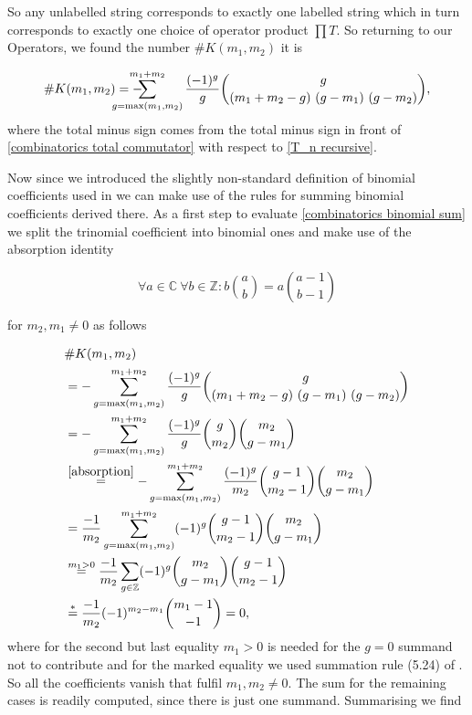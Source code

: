 \documentclass[b5paper,draft,openbib,12pt]{memoir}
\begin{document}
So any unlabelled  string corresponds to exactly one labelled string which in turn corresponds to 
exactly one choice of operator product \(\prod T\). 
So returning to our Operators, we found the number \(\#K(m_1,m_2)\) it is

\begin{equation}\label{combinatorics binomial sum}
\#K(m_1,m_2) =-\hspace{-0.9cm}\sum_{g=\max(m_1,m_2)}^{m_1+m_2} \frac{(-1)^g}{g} \binom{g}{(m_1+m_2-g) \ (g-m_1) \ (g - m_2)},
\end{equation}
where the total minus sign comes from the total minus sign in front of \eqref{combinatorics total commutator}
with respect to \eqref{T_n recursive}. 

Now since we introduced the slightly non-standard definition of binomial coefficients used in \cite{graham1994concrete} we
can make use of the rules for summing binomial coefficients derived there.
As a first step to evaluate \eqref{combinatorics binomial sum} we split the trinomial coefficient into binomial
ones and make use of the absorption identity

\begin{equation}\tag{absorption}\label{absorption}
\forall a \in \mathbb{C}\ \forall b \in \mathbb{Z}: b \binom{a}{b} = a \binom{a-1}{b-1} 
\end{equation}

for \(m_2,m_1\neq 0\) as follows

\begin{align*}
&\#K(m_1,m_2) \\
&=-\sum_{g=\max(m_1,m_2)}^{m_1+m_2} \frac{(-1)^g}{g} \binom{g}{(m_1+m_2-g) \ (g-m_1) \ (g - m_2)}\\
&=-\sum_{g=\max(m_1,m_2)}^{m_1+m_2} \frac{(-1)^g}{g} \binom{g}{m_2}\binom{m_2}{g-m_1}\\
&\stackrel{\eqref{absorption}}{=}-\sum_{g=\max(m_1,m_2)}^{m_1+m_2} \frac{(-1)^g}{m_2} \binom{g-1}{m_2-1}\binom{m_2}{g-m_1}\\
&=\frac{-1}{m_2} \sum_{g=\max(m_1,m_2)}^{m_1+m_2} (-1)^g \binom{g-1}{m_2-1}\binom{m_2}{g-m_1}\\
&\overset{m_1>0}{=}\frac{-1}{m_2} \sum_{g\in\mathbb{Z}} (-1)^g \binom{m_2}{g-m_1}\binom{g-1}{m_2-1}\\
&\stackrel{*}{=} \frac{-1}{m_2} (-1)^{m_2-m_1} \binom{m_1-1}{-1} = 0,
\end{align*}
where for the second but last equality \(m_1>0\) is needed for the \(g=0\) summand not to contribute and
for the marked equality we used summation rule (5.24) of \cite{graham1994concrete}. 
So all the coefficients vanish that fulfil \(m_1,m_2\neq 0\). The sum for the remaining cases
is readily computed, since there is just one summand. Summarising we find
\end{document}
